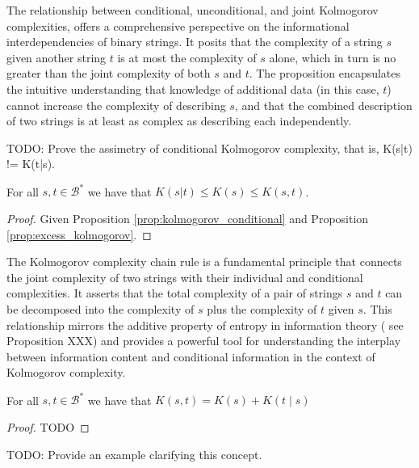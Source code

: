 The relationship between conditional, unconditional, and joint Kolmogorov complexities, offers a comprehensive perspective on the informational interdependencies of binary strings. It posits that the complexity of a string $s$ given another string $t$ is at most the complexity of $s$ alone, which in turn is no greater than the joint complexity of both $s$ and $t$. The proposition encapsulates the intuitive understanding that knowledge of additional data (in this case, $t$) cannot increase the complexity of describing $s$, and that the combined description of two strings is at least as complex as describing each independently.

{\color{red} TODO: Prove the assimetry of conditional Kolmogorov complexity, that is, K(s|t) != K(t|s).}

\begin{proposition}
\label{prop:kolmogorov_relations}
For all $s, t\in\mathcal{B}^{\ast}$ we have that $K(s | t ) \leq K(s) \leq K(s, t)$.
\end{proposition}
\begin{proof}
Given Proposition \ref{prop:kolmogorov_conditional} and Proposition \ref{prop:excess_kolmogorov}.
\end{proof}

The Kolmogorov complexity chain rule is a fundamental principle that connects the joint complexity of two strings with their individual and conditional complexities. It asserts that the total complexity of a pair of strings $s$ and $t$ can be decomposed into the complexity of $s$ plus the complexity of $t$ given $s$. This relationship mirrors the additive property of entropy in information theory ({\color{red} see Proposition XXX}) and provides a powerful tool for understanding the interplay between information content and conditional information in the context of Kolmogorov complexity.

\begin{proposition}
\label{prop:kolmogorov_chain_rule}
For all $s, t \in \mathcal{B}^{\ast}$ we have that $K(s, t) = K(s) + K(t \mid s)$
\end{proposition}
\begin{proof}
{\color{red} TODO}
\end{proof}

\begin{example}
{\color{red} TODO: Provide an example clarifying this concept.}
\end{example}

%
%

